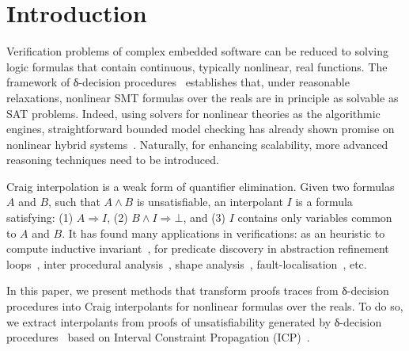 \section{Introduction}
\label{sec:intro}


Verification problems of complex embedded software can be reduced to solving logic formulas that contain continuous, typically nonlinear, real functions. The framework of δ-decision procedures~\cite{DBLP:conf/lics/GaoAC12,DBLP:conf/fmcad/GaoKC13} establishes that, under reasonable relaxations, nonlinear SMT formulas over the reals are in principle as solvable as SAT problems. Indeed, using solvers for nonlinear theories as the algorithmic engines, straightforward bounded model checking has already shown promise on nonlinear hybrid systems~\cite{DBLP:conf/cav/ChenAS13,DBLP:conf/tacas/KongGCC15}. Naturally, for enhancing scalability, more advanced reasoning techniques need to be introduced. 

Craig interpolation is a weak form of quantifier elimination.
Given two formulas $A$ and $B$, such that $A ∧ B$ is unsatisfiable, an interpolant $I$ is a formula satisfying: (1) $A ⇒ I$, (2) $B ∧ I ⇒ ⊥$, and (3) $I$ contains only variables common to $A$ and $B$.
It has found many applications in verifications:
as an heuristic to compute inductive invariant~\cite{DBLP:conf/cav/McMillan03,DBLP:conf/vmcai/McMillan07,DBLP:conf/sas/McMillan11},
for predicate discovery in abstraction refinement loops~\cite{DBLP:conf/cav/McMillan06},
inter procedural analysis~\cite{DBLP:conf/vmcai/AlbarghouthiGC12,DBLP:conf/cav/AlbarghouthiLGC12},
shape analysis~\cite{DBLP:conf/esop/AlbarghouthiBCK15},
fault-localisation~\cite{DBLP:conf/fm/ErmisSW12,DBLP:conf/vmcai/ChristESW13,DBLP:conf/sigsoft/SchafSW13}, etc.

In this paper, we present methods that transform proofs traces from δ-decision procedures into Craig interpolants for nonlinear formulas over the reals. To do so, we extract interpolants from proofs of unsatisfiability generated by δ-decision procedures~\cite{DBLP:conf/synasc/GaoKC14} based on Interval Constraint Propagation (ICP)~\cite{handbookICP}. 

